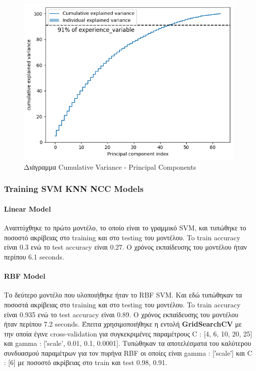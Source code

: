 \begin{figure}[ht]
	\centering
	\includegraphics[width=1\linewidth]{Images data1/KPCAsigm2plot.png}
	\caption{ Διάγραμμα Cumulative Variance - Principal Components   }
	\label{f:g6}	
\end{figure}
\clearpage
\subsubsection{Training SVM KNN NCC Models}

\paragraph{Linear Model}

Αναπτύχθηκε το πρώτο μοντέλο, το οποίο είναι το γραμμικό SVM, και
τυπώθηκε το ποσοστό ακρίβειας στο training και στο testing του μοντέλου. To train accuracy είναι 0.3 ενώ το test
accuracy είναι 0.27. Ο χρόνος εκπαίδευσης του μοντέλου ήταν περίπου 6.1 seconds.

\paragraph{RBF Model}
\clearline
Το δεύτερο μοντέλο που υλοποιήθηκε ήταν το RBF SVM. Και εδώ τυπώθηκαν τα ποσοστά
ακρίβειας στο training και στο testing του μοντέλου. To train accuracy είναι 0.935 ενώ το test accuracy είναι 0.89. Ο χρόνος εκπαίδευσης του μοντέλου ήταν περίπου 7.2 seconds.
Έπειτα χρησιμοποιήθηκε η εντολή \textbf{GridSearchCV} με την οποία έγινε cross-validation για συγκεκριμένες παραμέτρους C : [4, 6, 10, 20, 25] και gamma : [′scale', 0.01, 0.1, 0.0001]. Τυπώθηκαν τα αποτελέσματα του καλύτερου
συνδυασμού παραμέτρων για τον πυρήνα RBF οι οποίες είναι gamma : [′scale′] και C :
[6] με ποσοστό ακρίβειας στο train και test 0.98, 0.91.

